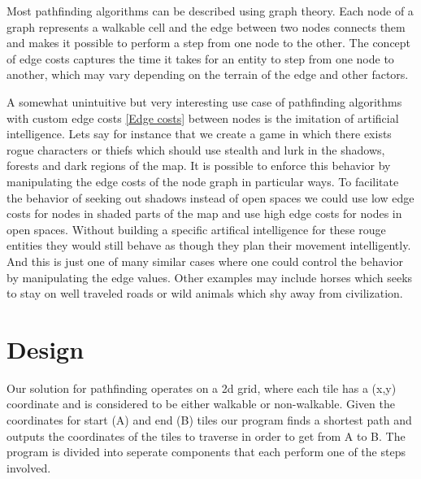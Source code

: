 \documentclass[12pt, a4paper]{article}
\begin{document}
Most pathfinding algorithms can be described using graph theory. Each node of a
graph represents a walkable cell and the edge between two nodes connects them
and makes it possible to perform a step from one node to the other. The concept
of edge costs captures the time it takes for an entity to step from one node to
another, which may vary depending on the terrain of the edge and other factors.




A somewhat unintuitive but very interesting use case of pathfinding algorithms
with custom edge costs \ref{Edge costs} between nodes is the imitation of
artificial intelligence. Lets say for instance that we create a game in which
there exists rogue characters or thiefs which should use stealth and lurk in the
shadows, forests and dark regions of the map. It is possible to enforce this
behavior by manipulating the edge costs of the node graph in particular ways. To
facilitate the behavior of seeking out shadows instead of open spaces we could
use low edge costs for nodes in shaded parts of the map and use high edge costs
for nodes in open spaces. Without building a specific artifical intelligence for
these rouge entities they would still behave as though they plan their movement
intelligently. And this is just one of many similar cases where one could
control the behavior by manipulating the edge values. Other examples may include
horses which seeks to stay on well traveled roads or wild animals which shy away
from civilization.



\section{Design}

Our solution for pathfinding operates on a 2d grid, where each tile has a
(x,y) coordinate and is considered to be either walkable or non-walkable.
Given the coordinates for start (A) and end (B) tiles our program finds a
shortest path and outputs the coordinates of the tiles to traverse in order
to get from A to B. The program is divided into seperate components that
each perform one of the steps involved.
\end{document}

